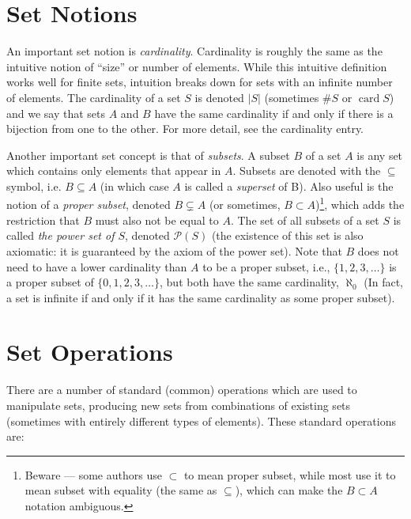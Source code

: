 \documentclass{article}
\newcommand{\caP}{\mathcal{P}}
\DeclareMathOperator{\card}{card}
\begin{document}
\section{Set Notions}

An important set notion is \emph{cardinality}. Cardinality is roughly the same as the intuitive notion of ``size'' or number of elements. While this intuitive definition works well for finite sets, intuition breaks down for sets with an infinite number of elements. The cardinality of a set $S$ is denoted $|S|$ (sometimes $\# S$ or $\card S$) and we say that sets $A$ and $B$ have the same cardinality if and only if there is a bijection from one to the other. For more detail, see the cardinality entry.

Another important set concept is that of \emph{subsets}. A subset $B$ of a set $A$ is any set which contains only elements that appear in $A$. Subsets are denoted with the $\subseteq$ symbol, i.e. $B \subseteq A$ (in which case $A$ is called a \emph{superset} of B). Also useful is the notion of a \emph{proper subset}, denoted $B \subsetneq A$ (or sometimes, $B \subset A$)\footnote{Beware --- some authors use $\subset$ to mean proper subset, while most use it to mean subset with equality (the same as $\subseteq$), which can make the $B \subset A$ notation ambiguous.}, which adds the restriction that $B$ must also not be equal to $A$. The set of all subsets of a set $S$ is called \emph{the power set of $S$}, denoted $\caP(S)$ (the existence of this set is also axiomatic: it is guaranteed by the axiom of the power set). Note that $B$ does not need to have a lower cardinality than $A$ to be a proper subset, i.e., $\{1, 2, 3, \dotsc\}$ is a proper subset of $\{0, 1, 2, 3, \dotsc\}$, but both have the same cardinality, $\aleph_0$ (In fact, a set is infinite if and only if it has the same cardinality as some proper subset).

\section{Set Operations}

There are a number of standard (common) operations which are used to manipulate sets, producing new sets from combinations of existing sets (sometimes with entirely different types of elements). These standard operations are:
\end{document}
